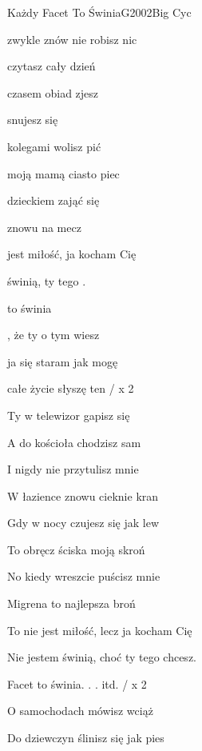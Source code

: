 \documentclass[a4paper,draft]{book}
\begin{document}
\begin{song}{Każdy Facet To Świnia}{G}{2002}{Big Cyc}{}{}
	\begin{SBVerse}
	 zwykle znów nie robisz nic

	 czytasz cały dzień

	 czasem obiad zjesz

	 snujesz się 

	 kolegami wolisz pić

	 moją mamą ciasto piec

	 dzieckiem zająć się

	 znowu  na mecz

	 jest miłość,  ja kocham Cię

	 świnią,  ty tego .
	\end{SBVerse}
	\begin{SBChorus}
	 to świnia

	, że ty o tym wiesz

	 ja się staram jak mogę

	 całe życie słyszę ten  / x 2
	\end{SBChorus}
	\begin{SBVerse}
	Ty w telewizor gapisz się

	A do kościoła chodzisz sam

	I nigdy nie przytulisz mnie

	W łazience znowu cieknie kran

	Gdy w nocy czujesz się jak lew

	To obręcz ściska moją skroń

	No kiedy wreszcie puścisz mnie

	Migrena to najlepsza broń

	To nie jest miłość, lecz ja kocham Cię

	Nie jestem świnią, choć ty tego chcesz.
	\end{SBVerse}
	\begin{SBChorus}
	Facet to świnia. . . itd. / x 2
	\end{SBChorus}
	\begin{SBVerse}
	O samochodach mówisz wciąż

	Do dziewczyn ślinisz się jak pies


\end{SBVerse}
\end{song}
\end{document}
